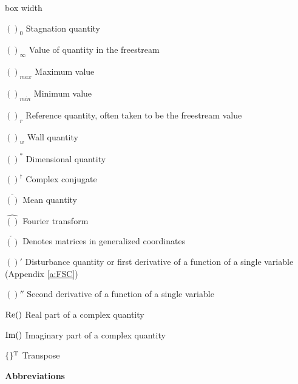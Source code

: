 \begin{descriptionlist}{box width}

\item[$()_0$]           Stagnation quantity

\item[$()_\infty$]      Value of quantity in the freestream

\item[$()_{max}$]	Maximum value

\item[$()_{min}$]	Minimum value

\item[$()_r$]		Reference quantity, often taken to be the 
                        freestream value

\item[$()_w$]		Wall quantity

\item[$()^*$]           Dimensional quantity

\item[$()^\dagger$]     Complex conjugate

\item[$\overline{()}$]  Mean quantity

\item[$\widehat{()}$]   Fourier transform

\item[$\check{()}$]     Denotes matrices in generalized coordinates

\item[$()'$]            Disturbance quantity or first derivative 
                        of a function of a single variable 
                        (Appendix \ref{a:FSC})

\item[$()''$]           Second derivative of a function of a single variable

\item[${\rm Re}()$]     Real part of a complex quantity

\item[${\rm Im}()$]     Imaginary part of a complex quantity

\item[$\{\}^{\rm T}$]	Transpose

\end{descriptionlist}

\bigskip
\centerline{\Large\bf Abbreviations}

